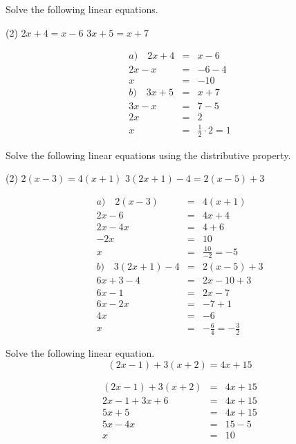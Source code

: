 \begin{frame}[t]
\begin{ex}
Solve the following linear equations.
\begin{tasks}(2)
\task $2x+4 =x-6$
\task $3x+5=x+7$
\end{tasks}
\end{ex}
\begin{sol}
\begin{eqnarray*}
a) \quad 2x + 4 &=& x - 6 \\
2x -x &=& -6-4 \\
x &=& -10 \\
b) \quad 3x+5 &=& x+7 \\
3x -x&=& 7-5 \\
2x &=& 2 \\
x &=& \frac{1}{2} \cdot 2 = 1
\end{eqnarray*}
\end{sol}
\end{frame}

\begin{frame}[t]
\begin{ex}
Solve the following linear equations using the distributive property.
\begin{tasks}(2)
\task $2(x - 3) = 4(x + 1)$
\task $3(2x + 1) - 4 = 2(x - 5) + 3$
\end{tasks}
\end{ex}
\begin{sol}
\begin{eqnarray*}
a) \quad 2(x - 3) &=& 4(x + 1) \\
2x - 6 &=& 4x + 4 \\
2x - 4x &=& 4 + 6 \\
-2x &=& 10 \\
x &=& \frac{10}{-2} = -5 \\[6pt]
b) \quad 3(2x + 1) - 4 &=& 2(x - 5) + 3 \\
6x + 3 - 4 &=& 2x - 10 + 3 \\
6x - 1 &=& 2x - 7 \\
6x - 2x &=& -7 + 1 \\
4x &=& -6 \\
x &=& -\frac{6}{4} = -\frac{3}{2}
\end{eqnarray*}
\end{sol}
\end{frame}

\begin{frame}[t]
\begin{ex}
Solve the following linear equation.
\[ (2x - 1) + 3(x + 2) = 4x + 15 \]
\end{ex}
\begin{sol}
\begin{eqnarray*}
(2x - 1) + 3(x + 2) &=& 4x + 15 \\
2x - 1 + 3x + 6 &=& 4x + 15 \\
5x + 5 &=& 4x + 15 \\
5x - 4x &=& 15 - 5 \\
x &=& 10
\end{eqnarray*}
\end{sol}
\end{frame}

